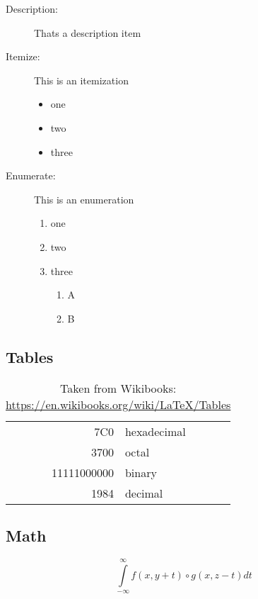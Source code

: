 \documentclass[a4paper,fontsize=12pt,toc=bib]{scrartcl}
\begin{document}
\begin{description}
    \item[Description:] Thats a description item

    \item[Itemize:] This is an itemization
        \begin{itemize}
            \item one
            \item two
            \item three
        \end{itemize}

    \item[Enumerate:] This is an enumeration
        \begin{enumerate}
            \item one
            \item two
            \item three
                \begin{enumerate}
                    \item A
                    \item B
                \end{enumerate}
        \end{enumerate}
\end{description}

\subsection{Tables}

\begin{table}[h]
    \centering
    \begin{tabular}{|r|l|}
        \hline
        7C0 & hexadecimal \\
        3700 & octal \\ \cline{2-2}
        11111000000 & binary \\
        \hline \hline
        1984 & decimal \\
        \hline
    \end{tabular}
    \caption{Taken from Wikibooks: \url{https://en.wikibooks.org/wiki/LaTeX/Tables}}
    \label{tab:demo1}
\end{table}

\subsection{Math}

\begin{equation}
    \int\limits_{-\infty}^{\infty}\! f(x,y+t)\circ g(x,z-t) dt
    \label{eq:demo1}
\end{equation}
\end{document}
